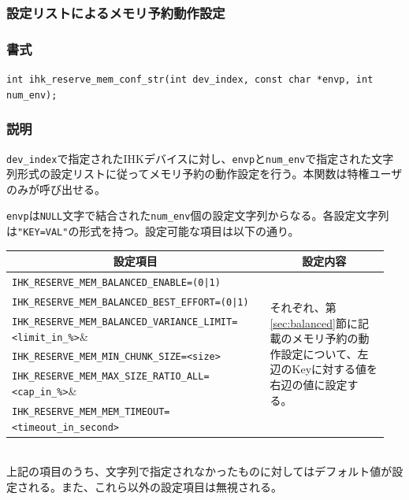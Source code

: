 \documentclass[twoside,11pt,fleqn]{book}
\begin{document}
\subsubsection{設定リストによるメモリ予約動作設定}
\subsubsection*{書式}{\quad} \verb:int ihk_reserve_mem_conf_str(int dev_index, const char *envp, int num_env);:
\subsubsection*{説明}{\quad} \verb:dev_index:で指定されたIHKデバイスに対し、\verb:envp:と\verb:num_env:で指定された文字列形式の設定リストに従ってメモリ予約の動作設定を行う。本関数は特権ユーザのみが呼び出せる。

\verb:envp:は\verb:NULL:文字で結合された\verb:num_env:個の設定文字列からなる。各設定文字列は\verb:"KEY=VAL":の形式を持つ。設定可能な項目は以下の通り。
\begin{table}[!h]
\footnotesize
\begin{tabular}{|p{0.65\linewidth}|p{0.30\linewidth}|} \hline
\multicolumn{1}{|c}{\textbf{設定項目}}&\multicolumn{1}{|c|}{\textbf{設定内容}}\\ \hline \hline
\verb:IHK_RESERVE_MEM_BALANCED_ENABLE=(0|1):&\multirow{6}{\linewidth}{それぞれ、第\ref{sec:balanced}節に記載のメモリ予約の動作設定について、左辺のKeyに対する値を右辺の値に設定する。}\\
\verb:IHK_RESERVE_MEM_BALANCED_BEST_EFFORT=(0|1):&\\
\verb:IHK_RESERVE_MEM_BALANCED_VARIANCE_LIMIT=<limit_in_%>:&\\
\verb:IHK_RESERVE_MEM_MIN_CHUNK_SIZE=<size>:&\\
\verb:IHK_RESERVE_MEM_MAX_SIZE_RATIO_ALL=<cap_in_%>:&\\
\verb:IHK_RESERVE_MEM_MEM_TIMEOUT=<timeout_in_second>:&\\ \hline
\end{tabular}
\vspace{-0em}
\end{table}
\\上記の項目のうち、文字列で指定されなかったものに対してはデフォルト値が設定される。また、これら以外の設定項目は無視される。
\FloatBarrier
\end{document}
